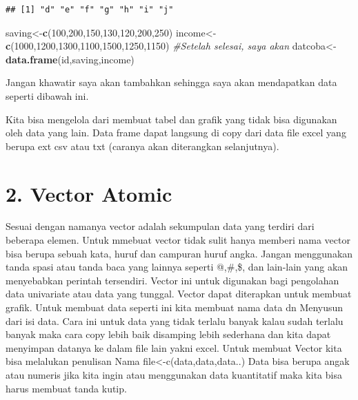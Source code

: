 \documentclass[
]{book}
\newenvironment{Shaded}{\begin{snugshade}}{\end{snugshade}}
\newcommand{\CommentTok}[1]{\textcolor[rgb]{0.56,0.35,0.01}{\textit{#1}}}
\newcommand{\DecValTok}[1]{\textcolor[rgb]{0.00,0.00,0.81}{#1}}
\newcommand{\FunctionTok}[1]{\textcolor[rgb]{0.13,0.29,0.53}{\textbf{#1}}}
\newcommand{\NormalTok}[1]{#1}
\newcommand{\OtherTok}[1]{\textcolor[rgb]{0.56,0.35,0.01}{#1}}
\theoremstyle{definition}
\theoremstyle{definition}
\theoremstyle{definition}
\theoremstyle{definition}
\theoremstyle{remark}
\begin{document}
\begin{verbatim}
## [1] "d" "e" "f" "g" "h" "i" "j"
\end{verbatim}

\begin{Shaded}
\begin{Highlighting}[]
\NormalTok{saving}\OtherTok{\textless{}{-}}\FunctionTok{c}\NormalTok{(}\DecValTok{100}\NormalTok{,}\DecValTok{200}\NormalTok{,}\DecValTok{150}\NormalTok{,}\DecValTok{130}\NormalTok{,}\DecValTok{120}\NormalTok{,}\DecValTok{200}\NormalTok{,}\DecValTok{250}\NormalTok{)}
\NormalTok{income}\OtherTok{\textless{}{-}}\FunctionTok{c}\NormalTok{(}\DecValTok{1000}\NormalTok{,}\DecValTok{1200}\NormalTok{,}\DecValTok{1300}\NormalTok{,}\DecValTok{1100}\NormalTok{,}\DecValTok{1500}\NormalTok{,}\DecValTok{1250}\NormalTok{,}\DecValTok{1150}\NormalTok{)}
\CommentTok{\#Setelah selesai, saya akan }
\NormalTok{datcoba}\OtherTok{\textless{}{-}}\FunctionTok{data.frame}\NormalTok{(id,saving,income)}
\end{Highlighting}
\end{Shaded}

Jangan khawatir saya akan tambahkan sehingga saya akan mendapatkan data seperti dibawah ini.

Kita bisa mengelola dari membuat tabel dan grafik yang tidak bisa digunakan oleh data yang lain.
Data frame dapat langsung di copy dari data file excel yang berupa ext csv atau txt (caranya akan diterangkan selanjutnya).

\hypertarget{vector-atomic}{%
\section*{2. Vector Atomic}\label{vector-atomic}}

Sesuai dengan namanya vector adalah sekumpulan data yang terdiri dari beberapa elemen. Untuk mmebuat vector tidak sulit hanya memberi nama vector bisa berupa sebuah kata, huruf dan campuran huruf angka. Jangan menggunakan tanda spasi atau tanda baca yang lainnya seperti @,\#,\$, dan lain-lain yang akan menyebabkan perintah tersendiri.
Vector ini untuk digunakan bagi pengolahan data univariate atau data yang tunggal. Vector dapat diterapkan untuk membuat grafik. Untuk membuat data seperti ini kita membuat nama data dn Menyusun dari isi data. Cara ini untuk data yang tidak terlalu banyak kalau sudah terlalu banyak maka cara copy lebih baik disamping lebih sederhana dan kita dapat menyimpan datanya ke dalam file lain yakni excel.
Untuk membuat Vector kita bisa melalukan penulisan
Nama file\textless-c(data,data,data..)
Data bisa berupa angak atau numeris jika kita ingin atau menggunakan data kuantitatif maka kita bisa harus membuat tanda kutip.
\end{document}
